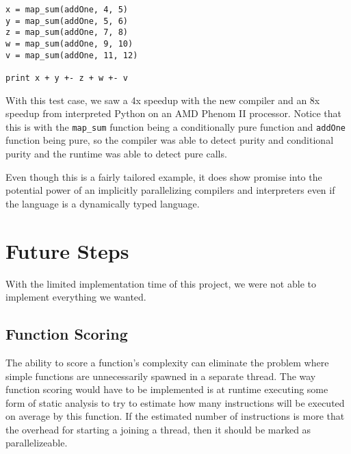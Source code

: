 \documentclass{acm_proc_article-sp}
\begin{document}
\begin{verbatim}
x = map_sum(addOne, 4, 5)                                                                                                                                                                                           
y = map_sum(addOne, 5, 6)                                                                                                                                                                                           
z = map_sum(addOne, 7, 8)                                                                                                                                                                                           
w = map_sum(addOne, 9, 10)                                                                                                                                                                                          
v = map_sum(addOne, 11, 12)                                                                                                                                                                                         
                                                                                                                                                                                                                    
print x + y +- z + w +- v
\end{verbatim}

With this test case, we saw a 4x speedup with the new compiler and an 8x
speedup from interpreted Python on an AMD Phenom II processor. Notice that
this is with the \verb|map_sum| function being a conditionally pure function
and \verb|addOne| function being pure, so the compiler was able to detect purity
and conditional purity and the runtime was able to detect pure calls.

Even though this is a fairly tailored example, it does show promise into the potential
power of an implicitly parallelizing compilers and interpreters even if the language
is a dynamically typed language. 

\section*{Future Steps}
With the limited implementation time of this project, we were not able to implement everything
we wanted.

\subsection*{Function Scoring}
The ability to score a function's complexity can eliminate the problem where
simple functions are unnecessarily spawned in a separate thread. The way function
scoring would have to be implemented is at runtime executing some form of static
analysis to try to estimate how many instructions will be executed on average by
this function. If the estimated number of instructions is more that the overhead
for starting a joining a thread, then it should be marked as parallelizeable.
\end{document}
